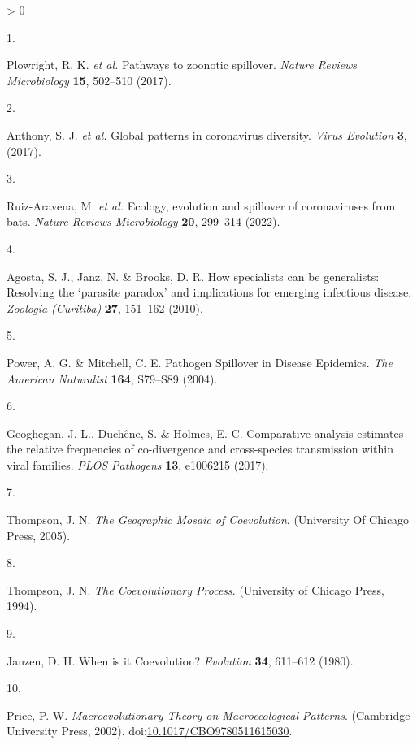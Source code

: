 \documentclass[11pt]{article}
\newlength{\cslhangindent}
\newlength{\csllabelwidth}
\newenvironment{CSLReferences}[3] %
 {%
  \setlength{\parindent}{0pt}
  \ifodd #1 \everypar{\setlength{\hangindent}{\cslhangindent}}\ignorespaces\fi
  \ifnum #2 > 0
  \setlength{\parskip}{#2\baselineskip}
  \fi
 }%
 {}
\newcommand{\CSLLeftMargin}[1]{\parbox[t]{\maxof{\widthof{#1}}{\csllabelwidth}}{#1}}
\newcommand{\CSLRightInline}[1]{\parbox[t]{\linewidth}{#1}}
\begin{document}
\hypertarget{refs}{}
\begin{CSLReferences}{0}{0}
\leavevmode\hypertarget{ref-Plowright2017PatZoo}{}%
\CSLLeftMargin{1. }
\CSLRightInline{Plowright, R. K. \emph{et al.} Pathways to zoonotic
spillover. \emph{Nature Reviews Microbiology} \textbf{15}, 502--510
(2017).}

\leavevmode\hypertarget{ref-Anthony2017GloPat}{}%
\CSLLeftMargin{2. }
\CSLRightInline{Anthony, S. J. \emph{et al.} Global patterns in
coronavirus diversity. \emph{Virus Evolution} \textbf{3}, (2017).}

\leavevmode\hypertarget{ref-Ruiz-Aravena2022EcoEvo}{}%
\CSLLeftMargin{3. }
\CSLRightInline{Ruiz-Aravena, M. \emph{et al.} Ecology, evolution and
spillover of coronaviruses from bats. \emph{Nature Reviews Microbiology}
\textbf{20}, 299--314 (2022).}

\leavevmode\hypertarget{ref-Agosta2010HowSpe}{}%
\CSLLeftMargin{4. }
\CSLRightInline{Agosta, S. J., Janz, N. \& Brooks, D. R. How specialists
can be generalists: Resolving the {`parasite paradox'} and implications
for emerging infectious disease. \emph{Zoologia (Curitiba)} \textbf{27},
151--162 (2010).}

\leavevmode\hypertarget{ref-Power2004PatSpi}{}%
\CSLLeftMargin{5. }
\CSLRightInline{Power, A. G. \& Mitchell, C. E. Pathogen Spillover in
Disease Epidemics. \emph{The American Naturalist} \textbf{164}, S79--S89
(2004).}

\leavevmode\hypertarget{ref-Geoghegan2017ComAna}{}%
\CSLLeftMargin{6. }
\CSLRightInline{Geoghegan, J. L., Duchêne, S. \& Holmes, E. C.
Comparative analysis estimates the relative frequencies of co-divergence
and cross-species transmission within viral families. \emph{PLOS
Pathogens} \textbf{13}, e1006215 (2017).}

\leavevmode\hypertarget{ref-Thompson2005GeoMos}{}%
\CSLLeftMargin{7. }
\CSLRightInline{Thompson, J. N. \emph{The Geographic Mosaic of
Coevolution}. (University Of Chicago Press, 2005).}

\leavevmode\hypertarget{ref-Thompson1994CoePro}{}%
\CSLLeftMargin{8. }
\CSLRightInline{Thompson, J. N. \emph{The Coevolutionary Process}.
(University of Chicago Press, 1994).}

\leavevmode\hypertarget{ref-Janzen1980WheIt}{}%
\CSLLeftMargin{9. }
\CSLRightInline{Janzen, D. H. When is it Coevolution? \emph{Evolution}
\textbf{34}, 611--612 (1980).}

\leavevmode\hypertarget{ref-Price2002MacThe}{}%
\CSLLeftMargin{10. }
\CSLRightInline{Price, P. W. \emph{Macroevolutionary Theory on
Macroecological Patterns}. (Cambridge University Press, 2002).
doi:\href{https://doi.org/10.1017/CBO9780511615030}{10.1017/CBO9780511615030}.}


\end{CSLReferences}
\end{document}
